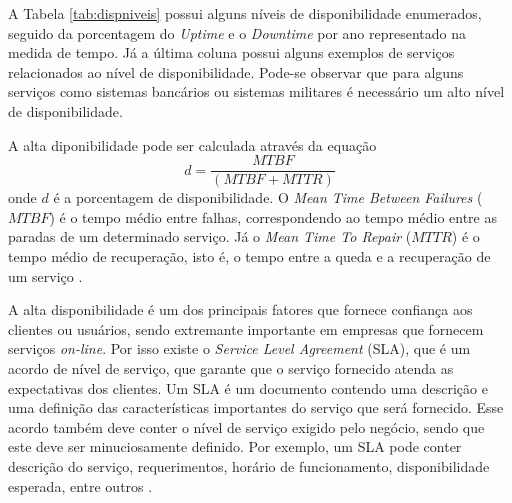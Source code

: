 A Tabela \ref{tab:dispniveis} possui alguns níveis de disponibilidade enumerados, seguido da porcentagem do \textit{Uptime} e 
o \textit{Downtime} por ano representado na medida de tempo.
Já a última coluna possui alguns exemplos de serviços relacionados ao nível de disponibilidade. 
Pode-se observar que para alguns serviços como sistemas bancários ou sistemas militares é necessário um alto nível de disponibilidade.

A alta diponibilidade pode ser calculada através da equação
\begin{equation}
d = \frac{MTBF}{(MTBF + MTTR)}
\label{diponibilidade}
\end{equation}
onde $d$ é a porcentagem de disponibilidade. O \textit{Mean Time Between Failures} ($MTBF$) é o tempo médio entre falhas, correspondendo ao 
tempo médio entre as paradas de um determinado serviço. Já o \textit{Mean Time To Repair} ($MTTR$) é o tempo médio de recuperação, isto é, 
o tempo entre a queda e a recuperação de um serviço \cite{goncalves2009}.

A alta disponibilidade é um dos principais fatores que fornece confiança aos clientes ou usuários, sendo extremante importante em empresas 
que fornecem serviços \textit{on-line}. Por isso existe o \textit{Service Level Agreement} (SLA), que é um acordo de nível de serviço, 
que garante que o serviço fornecido atenda as expectativas dos clientes. Um SLA é um documento contendo uma descrição e uma definição 
das características importantes do serviço que será fornecido. Esse acordo também deve conter o nível de serviço exigido pelo negócio, 
sendo que este deve ser minuciosamente definido. Por exemplo, um SLA pode conter descrição do serviço, requerimentos, horário de funcionamento,
disponibilidade esperada, entre outros \cite{smith2010}.

